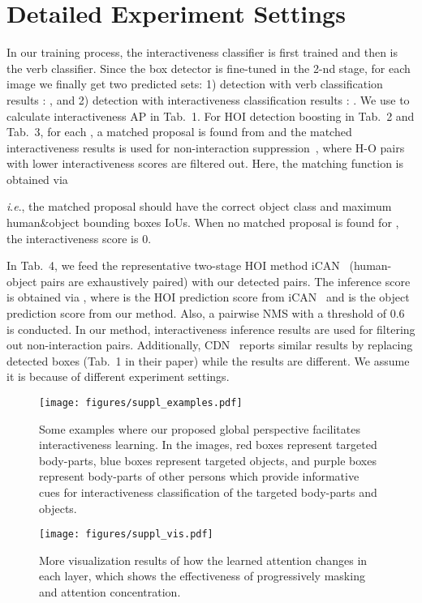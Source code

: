 \documentclass[runningheads]{llncs}
\newcommand{\ie}{\textit{i}.\textit{e}.}
\begin{document}
\section{Detailed Experiment Settings}
In our training process, the interactiveness classifier is first trained and then is the verb classifier. Since the box detector is fine-tuned in the 2-nd stage, for each image we finally get two predicted sets: 1) detection with verb classification results : , and 2) detection with interactiveness classification results  : . We use  to calculate interactiveness AP in Tab.~1. For HOI detection boosting in Tab.~2 and Tab.~3, for each , a matched proposal  is found from  and the matched interactiveness results  is used for non-interaction suppression~\cite{li2019transferable}, where H-O pairs with lower interactiveness scores  are filtered out. Here, the matching function  is obtained via

\ie, the matched proposal should have the correct object class and maximum human\&object bounding boxes IoUs. When no matched proposal is found for , the interactiveness score is 0. 

In Tab.~4, we feed the representative two-stage HOI method iCAN~\cite{gao2018ican} (human-object pairs are exhaustively paired) with our detected pairs. 
The inference score  is obtained via , where  is the HOI prediction score from iCAN~\cite{gao2018ican} and  is the object prediction score from our method. Also, a pairwise NMS with a threshold of 0.6 is conducted. In our method, interactiveness inference results are used for filtering out non-interaction pairs.
Additionally, CDN~\cite{cdn} reports similar results by replacing detected boxes (Tab.~1 in their paper) while the results are different. We assume it is because of different experiment settings.

\begin{figure}
\centering
\texttt{[image: figures/suppl\_examples.pdf]}
\caption{Some examples where our proposed global perspective facilitates interactiveness learning. In the images, red boxes represent targeted body-parts, blue boxes represent targeted objects, and purple boxes represent body-parts of other persons which provide informative cues for interactiveness classification of the targeted body-parts and objects.}
\label{fig:examples}
\end{figure}

\begin{figure}
\centering
\texttt{[image: figures/suppl\_vis.pdf]}
\caption{More visualization results of how the learned attention changes in each layer, which shows the effectiveness of progressively masking and attention concentration.}
\label{fig:vis_more}
\end{figure}
\end{document}
